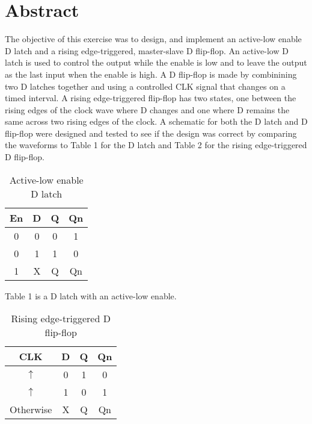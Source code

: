\documentclass[CMPE]{KGCOEReport}
\begin{document}
\maketitle

\section*{Abstract}
The objective of this exercise was to design, and implement an active-low enable D latch and a rising edge-triggered, master-slave D flip-flop. An active-low D latch is used to control the output while the enable is low and to leave the output as the last input when the enable is high. A D flip-flop is made by combinining two D latches together and using a controlled CLK signal that changes on a timed interval. A rising edge-triggered flip-flop has two states, one between the rising edges of the clock wave where D changes and one where D remains the same across two rising edges of the clock. A schematic for both the D latch and D flip-flop were designed and tested to see if the design was correct by comparing the waveforms to Table 1 for the D latch and Table 2 for the rising edge-triggered D flip-flop.

\begin{table}[H]
	\centering
	\caption{Active-low enable D latch}
	\label{tab: Table 1}
	\begin{tabular}{|c|c||c|c|}
		\hline
		En & D & Q & Qn\\ \hline
		0 & 0 & 0 & 1\\ \hline
		0 & 1 & 1 & 0\\ \hline
		1 & X & Q & Qn\\ \hline
		\hline
	\end{tabular}
\end{table}

Table 1 is a D latch with an active-low enable.

\begin{table}[H]
	\centering
	\caption{Rising edge-triggered D flip-flop}
	\label{tab: Table 1}
	\begin{tabular}{|c|c||c|c|}
		\hline
		CLK & D & Q & Qn\\ \hline
		$\uparrow$ & 0 & 1 & 0\\ \hline
		$\uparrow$ & 1 & 0 & 1\\ \hline
		Otherwise & X & Q & Qn\\ \hline
		\hline
	\end{tabular}
\end{table}
\end{document}
